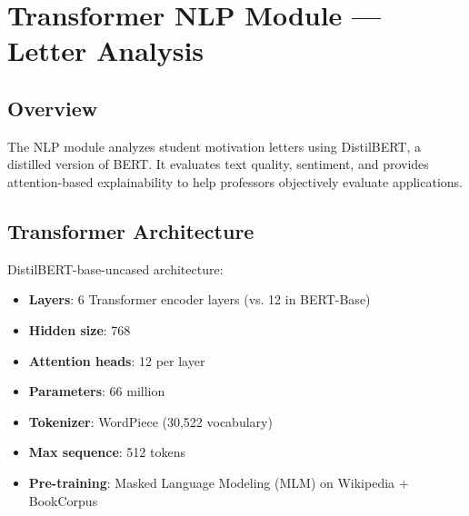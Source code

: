 \documentclass[12pt,a4paper]{report}
\begin{document}
\chapter{Transformer NLP Module — Letter Analysis}

\section{Overview}

The NLP module analyzes student motivation letters using DistilBERT, a distilled version of BERT. It evaluates text quality, sentiment, and provides attention-based explainability to help professors objectively evaluate applications.

\section{Transformer Architecture}

DistilBERT-base-uncased architecture:
\begin{itemize}
    \item \textbf{Layers}: 6 Transformer encoder layers (vs. 12 in BERT-Base)
    \item \textbf{Hidden size}: 768
    \item \textbf{Attention heads}: 12 per layer
    \item \textbf{Parameters}: 66 million
    \item \textbf{Tokenizer}: WordPiece (30,522 vocabulary)
    \item \textbf{Max sequence}: 512 tokens
    \item \textbf{Pre-training}: Masked Language Modeling (MLM) on Wikipedia + BookCorpus
\end{itemize}
\end{document}
